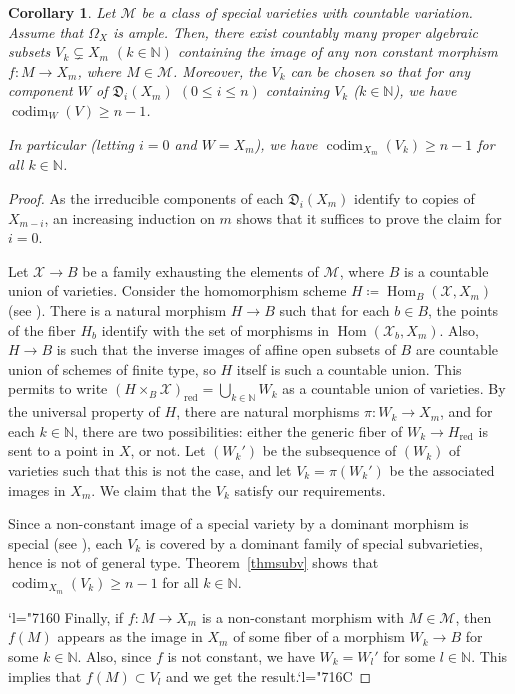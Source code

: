 \documentclass[JEP,XML,SOM,Unicode, NoEqCountersInSection,NoFloatCountersInSection,published]{cedram}
\let\mathcal\mathscr
\newcommand{\Changel}{\mathcode`l="7160}
\newcommand{\Changelback}{\mathcode`l="716C}
\newcommand{\red}{\mathrm{red}}
\DeclareMathOperator{\codim}{codim}
\DeclareMathOperator{\Hom}{Hom}
\theoremstyle{theorem}
\newtheorem{corollary}[proposition]{Corollary}
\theoremstyle{definition}
\begin{document}
\begin{corollary} \label{corolexcalg} Let \(\mathcal{M}\) be a class of \emph{special} varieties with countable variation. Assume that $\Omega_X$ is ample. Then, there exist countably many proper algebraic subsets $V_k \subsetneq X_m$ $(k \in \mathbb N)$ containing the image of any non constant morphism \(f : M \to X_{m}\), where \(M \in \mathcal{M}\). Moreover, the $V_k$ can be chosen so that for any component $W$ of $\mathfrak{D}_i(X_m)$ $(0 \leq i \leq n)$ containing $V_k$ ($k \in \mathbb N$), we have $\codim_{W} (V) \geq n - 1$.

In particular (letting $i = 0$ and $W = X_m$), we have $\codim_{X_m} (V_k) \geq n - 1$ for all $k \in \mathbb N$.
\end{corollary}
\begin{proof}
As the irreducible components of each $\mathfrak{D}_{i}(X_m)$ identify to copies of $X_{m - i}$, an increasing induction on \(m\) shows that it suffices to prove the claim for \(i = 0\).

Let \(\mathcal{X} \to B\) be a family exhausting the elements of \(\mathcal{M}\), where \(B\) is a countable union of varieties. Consider the homomorphism scheme \(H \coloneqq  \Hom_{B}(\mathcal{X}, X_{m})\) (see \cite[Ch.\,I, \S7]{ACG}). There is a natural morphism \(H \to B\) such that for each \(b \in B\), the points of the fiber \(H_{b}\) identify with the set of morphisms in \(\Hom(\mathcal{X}_{b}, X_{m})\). Also, \(H \to B\) is such that the inverse images of affine open subsets of \(B\) are countable union of schemes of finite type, so \(H\) itself is such a countable union. This permits to write \((H \times_{B} \mathcal{X})_{\red} = \bigcup_{k \in \mathbb{N}} W_{k}\) as a countable union of varieties. By the universal property of \(H\), there are natural morphisms \(\pi : W_{k} \to X_{m}\), and for each \(k \in \mathbb{N}\), there are two possibilities: either the generic fiber of \(W_{k} \to H_{\red}\) is sent to a point in \(X\), or not. Let \((W_{k}')\) be the subsequence of \((W_{k})\) of varieties such that this is not the case, and let \(V_{k} = \pi(W_{k}')\) be the associated images in \(X_{m}\). We claim that the \(V_{k}\) satisfy our requirements.

Since a non-constant image of a special variety by a dominant morphism is special (see \cite[Lem.\,2.9]{Cam04}), each \(V_{k}\) is covered by a dominant family of special subvarieties, hence is not of general type. Theorem~\ref{thmsubv} shows that \(\codim_{X_{m}} (V_{k}) \geq n - 1\) for all \(k \in \mathbb{N}\).

\Changel{}
Finally, if \(f : M \to X_{m}\) is a non-constant morphism with \(M \in \mathcal{M}\), then \(f(M)\) appears as the image in \(X_{m}\) of some fiber of a morphism \(W_{k} \to B\) for some \(k \in \mathbb{N}\). Also, since \(f\) is not constant, we have \(W_{k} = W_{l}'\) for some \(l \in \mathbb{N}\). This implies that \(f(M) \subset V_{l}\) and we get the result.\Changelback{}
\end{proof}
\end{document}
